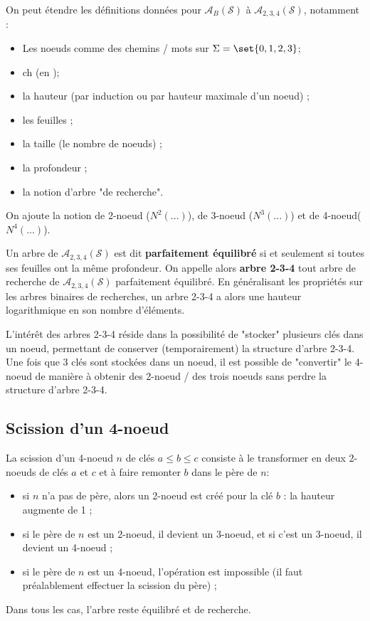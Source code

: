 \documentclass{scrartcl}
\begin{document}
			On peut étendre les définitions données pour $\mathscr{A}_B(\mathcal{S})$ à $\mathscr{A}_{2,3,4}(\mathcal{S})$, notamment : 
			\begin{multicols}{2}
			\begin{itemize}
				\item Les noeuds comme des chemins / mots sur $\Sigma = \set{0,1,2,3}$;
				\item ch (en \exercice);
				\item la hauteur (par induction ou par hauteur maximale d'un noeud) ;
				\item les feuilles ;
				\item la taille (le nombre de noeuds) ;
				\item la profondeur ;
				\item la notion d'arbre "de recherche".
			\end{itemize}
			\end{multicols}

			On ajoute la notion de 2-noeud ($N^2(...)$), de 3-noeud ($N^3(...)$) et de 4-noeud($N^4(...)$).

			Un arbre de $\mathscr{A}_{2,3,4}(\mathcal{S})$ est dit \textbf{parfaitement équilibré} si et seulement si toutes ses feuilles ont la même profondeur.
			On appelle alors \textbf{arbre 2-3-4} tout arbre de recherche de $\mathscr{A}_{2,3,4}(\mathcal{S})$ parfaitement équilibré.
			En généralisant les propriétés sur les arbres binaires de recherches, un arbre 2-3-4 a alors une hauteur logarithmique en son nombre d'éléments.

			L'intérêt des arbres 2-3-4 réside dans la possibilité de "stocker" plusieurs clés dans un noeud, permettant de conserver (temporairement) la structure d'arbre 2-3-4. 
			Une fois que 3 clés sont stockées dans un noeud, il est possible de "convertir" le 4-noeud de manière à obtenir des 2-noeud / des trois noeuds sans perdre la structure d'arbre 2-3-4.
		\subsection{Scission d'un 4-noeud}
			La scission d'un 4-noeud $n$ de clés $a \leq b \leq c$ consiste à le transformer en deux 2-noeuds de clés $a$ et $c$ et à faire remonter $b$ dans le père de $n$:
			\begin{itemize}
				\item si $n$ n'a pas de père, alors un 2-noeud est créé pour la clé $b$ : la hauteur augmente de 1 ; 
				\item si le père de $n$ est un 2-noeud, il devient un 3-noeud, et si c'est un 3-noeud, il devient un 4-noeud ;
				\item si le père de $n$ est un 4-noeud, l'opération est impossible (il faut préalablement effectuer la scission du père) ;
			\end{itemize}
			Dans tous les cas, l'arbre reste équilibré et de recherche.
\end{document}
